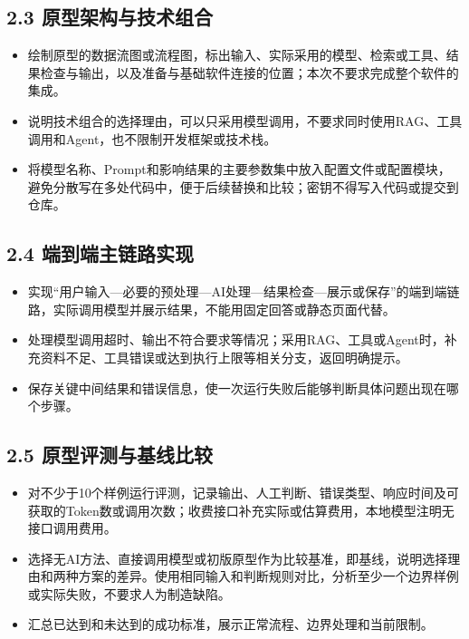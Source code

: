 \documentclass[UTF8,12pt,a4paper]{ctexart}
\begin{document}
\subsection*{2.3 原型架构与技术组合}

\begin{itemize}
  \item 绘制原型的数据流图或流程图，标出输入、实际采用的模型、检索或工具、结果检查与输出，以及准备与基础软件连接的位置；本次不要求完成整个软件的集成。
  \item 说明技术组合的选择理由，可以只采用模型调用，不要求同时使用RAG、工具调用和Agent，也不限制开发框架或技术栈。
  \item 将模型名称、Prompt和影响结果的主要参数集中放入配置文件或配置模块，避免分散写在多处代码中，便于后续替换和比较；密钥不得写入代码或提交到仓库。
\end{itemize}

\subsection*{2.4 端到端主链路实现}

\begin{itemize}
  \item 实现“用户输入—必要的预处理—AI处理—结果检查—展示或保存”的端到端链路，实际调用模型并展示结果，不能用固定回答或静态页面代替。
  \item 处理模型调用超时、输出不符合要求等情况；采用RAG、工具或Agent时，补充资料不足、工具错误或达到执行上限等相关分支，返回明确提示。
  \item 保存关键中间结果和错误信息，使一次运行失败后能够判断具体问题出现在哪个步骤。
\end{itemize}

\subsection*{2.5 原型评测与基线比较}

\begin{itemize}
  \item 对不少于10个样例运行评测，记录输出、人工判断、错误类型、响应时间及可获取的Token数或调用次数；收费接口补充实际或估算费用，本地模型注明无接口调用费用。
  \item 选择无AI方法、直接调用模型或初版原型作为比较基准，即基线，说明选择理由和两种方案的差异。使用相同输入和判断规则对比，分析至少一个边界样例或实际失败，不要求人为制造缺陷。
  \item 汇总已达到和未达到的成功标准，展示正常流程、边界处理和当前限制。
\end{itemize}
\end{document}
